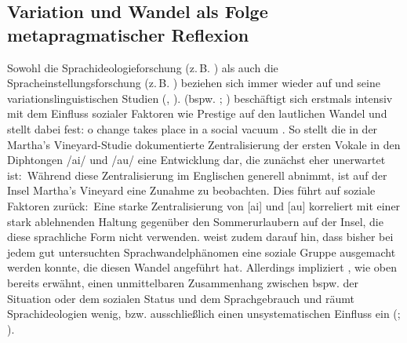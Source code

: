 \subsection{Variation und Wandel als Folge metapragmatischer Reflexion}
\label{sec:WandeldurchIndexikalitaet}
Sowohl die Sprachideologieforschung (z.\,B. \citealp{Eckert.2016}) als auch die Spracheinstellungsforschung (z.\,B. \citealp[12]{Hundt.1992}) beziehen sich immer wieder auf \citeauthor{Labov1963} und seine variationslinguistischen Studien (\citealp[etwa][]{Labov1963}, \citeyear{Labov2006}). 
\citeauthor{Labov1963} (bspw. \citeyear{Labov1963}; \citeyear{Labov1973}) beschäftigt sich 
erstmals intensiv mit dem Einfluss sozialer Faktoren wie Prestige auf den lautlichen Wandel und stellt dabei fest: \glqq [N]o change takes place in a social vacuum\grqq{} \citep[274]{Labov1963}. 
So stellt die in der Martha's Vineyard-Studie dokumentierte Zentralisierung der ersten Vokale in den Diphtongen /ai/ und /au/ eine Entwicklung dar, die zunächst eher unerwartet ist:~W{\"a}hrend diese Zentralisierung im Englischen generell abnimmt, ist auf der Insel Martha's Vineyard eine Zunahme zu beobachten. 
Dies f{\"u}hrt \citet{Labov1963} auf soziale Faktoren zur{\"u}ck:~Eine starke Zentralisierung von [ai] und [au] korreliert mit einer stark ablehnenden Haltung gegen{\"u}ber den Sommerurlaubern auf der Insel, die diese sprachliche Form nicht verwenden.
\citet[223]{Labov1973} weist zudem darauf hin, dass bisher bei jedem gut untersuchten Sprachwandelph{\"a}nomen eine soziale Gruppe ausgemacht werden konnte, die diesen Wandel angef{\"u}hrt hat. 
Allerdings impliziert \citet{Labov2006}, wie oben bereits erwähnt, einen unmittelbaren Zusammenhang zwischen bspw. der Situation oder dem sozialen Status und dem Sprachgebrauch und räumt Sprachideologien wenig, bzw. ausschließlich einen unsystematischen Einfluss ein (\citealp[s.][70]{Woolard1994}; \citealp[13]{Woolard1998}).

